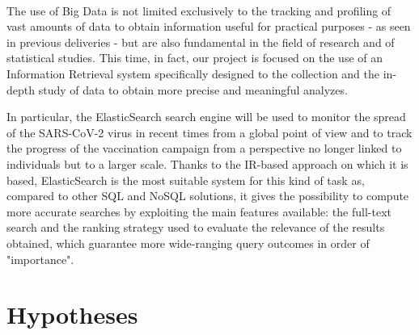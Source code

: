 \documentclass[a4paper,12pt]{article}
\begin{document}
\paragraph{}The use of Big Data is not limited exclusively to the tracking and profiling of vast amounts of data to obtain information useful for practical purposes - as seen in previous deliveries - but are also fundamental in the field of research and of statistical studies. This time, in fact, our project is focused on the use of an Information Retrieval system specifically designed to the collection and the in-depth study of data to obtain more precise and meaningful analyzes. \par
In particular, the ElasticSearch search engine will be used to monitor the spread of the SARS-CoV-2 virus in recent times from a global point of view and to track the progress of the vaccination campaign from a perspective no longer linked to individuals but to a larger scale. Thanks to the IR-based approach on which it is based, ElasticSearch is the most suitable system for this kind of task as, compared to other SQL and NoSQL solutions, it gives the possibility to compute more accurate searches by exploiting the main features available: the full-text search and the ranking strategy used to evaluate the relevance of the results obtained, which guarantee more wide-ranging query outcomes in order of "importance".
\section{Hypotheses}
\end{document}
